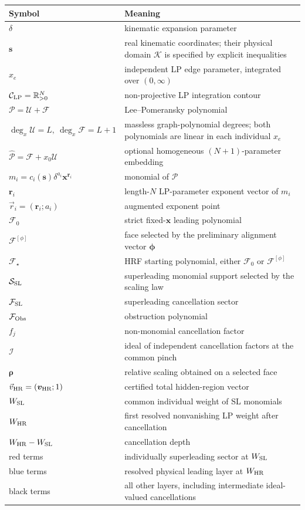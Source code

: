 \documentclass[a4paper,11pt]{article}
\newcommand{\x}{\boldsymbol{x}}
\newcommand{\s}{\boldsymbol{s}}
\newcommand{\K}{\mathcal K}
\newcommand{\HR}{\mathrm{HR}}
\newcommand{\FSL}{\mathcal F_{\rm SL}}
\newcommand{\SSL}{\mathcal S_{\rm SL}}
\newcommand{\FObs}{\mathcal F_{\rm Obs}}
\newcommand{\WSL}{W_{\rm SL}}
\newcommand{\WHR}{W_{\rm HR}}
\newcommand{\vHR}{\vec v_{\rm HR}}
\newcommand{\ideal}{\mathcal I}
\newcommand{\SLcolour}[1]{{\color{red}#1}}
\newcommand{\HRcolour}[1]{{\color{blue}#1}}
\newcommand{\Othercolour}[1]{{\color{black}#1}}
\begin{document}
\begin{center}
\begin{tabular}{@{}p{}p{}@{}}
\toprule
Symbol & Meaning\\
\midrule
\(\delta\) & kinematic expansion parameter\\
\(\s\) & real kinematic coordinates; their physical domain \(\K\) is specified
  by explicit inequalities\\
\(x_e\) & independent LP edge parameter, integrated over \((0,\infty)\)\\
\(\mathcal C_{\rm LP}=\mathbb R_{>0}^{N}\) & non-projective LP integration
  contour\\
\(\mathcal P=\mathcal U+\mathcal F\) & Lee--Pomeransky polynomial\\
\(\deg_x\mathcal U=L,\ \deg_x\mathcal F=L+1\) & massless graph-polynomial
  degrees; both polynomials are linear in each individual \(x_e\)\\
\(\widehat{\mathcal P}=\mathcal F+x_0\mathcal U\) & optional homogeneous
  \((N+1)\)-parameter embedding\\
\(m_i=c_i(\s)\delta^{a_i}\x^{\boldsymbol r_i}\) & monomial of
  \(\mathcal P\)\\
\(\boldsymbol r_i\) & length-\(N\) LP-parameter exponent vector of \(m_i\)\\
\(\vec r_i=(\boldsymbol r_i;a_i)\) & augmented exponent point\\
\(\mathcal F_0\) & strict fixed-\(\x\) leading polynomial\\
\(\mathcal F^{[\phi]}\) & face selected by the preliminary alignment vector
  \(\boldsymbol\phi\)\\
\(\mathcal F_\star\) & HRF starting polynomial, either
  \(\mathcal F_0\) or \(\mathcal F^{[\phi]}\)\\
\(\SSL\) & superleading monomial support selected by the scaling law\\
\(\FSL\) & superleading cancellation sector\\
\(\FObs\) & obstruction polynomial\\
\(f_j\) & non-monomial cancellation factor\\
\(\ideal\) & ideal of independent cancellation factors at the common pinch\\
\(\boldsymbol\rho\) & relative scaling obtained on a selected face\\
\(\vHR=(\boldsymbol v_{\HR};1)\) & certified total hidden-region vector\\
\(\WSL\) & common individual weight of SL monomials\\
\(\WHR\) & first resolved nonvanishing LP weight after cancellation\\
\(\WHR-\WSL\) & cancellation depth\\
\SLcolour{red terms} & individually superleading sector at \(\WSL\)\\
\HRcolour{blue terms} & resolved physical leading layer at \(\WHR\)\\
\Othercolour{black terms} & all other layers, including intermediate
  ideal-valued cancellations\\
\bottomrule
\end{tabular}
\end{center}
\end{document}
